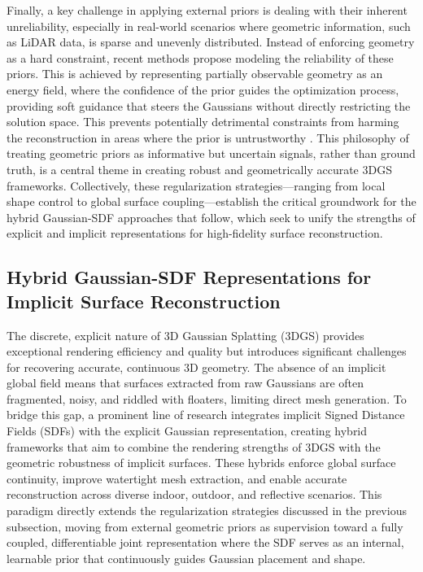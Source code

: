 \documentclass[11pt]{article}
\begin{document}
Finally, a key challenge in applying external priors is dealing with their inherent unreliability, especially in real-world scenarios where geometric information, such as LiDAR data, is sparse and unevenly distributed. Instead of enforcing geometry as a hard constraint, recent methods propose modeling the reliability of these priors. This is achieved by representing partially observable geometry as an energy field, where the confidence of the prior guides the optimization process, providing soft guidance that steers the Gaussians without directly restricting the solution space. This prevents potentially detrimental constraints from harming the reconstruction in areas where the prior is untrustworthy \cite{ref194}. This philosophy of treating geometric priors as informative but uncertain signals, rather than ground truth, is a central theme in creating robust and geometrically accurate 3DGS frameworks. Collectively, these regularization strategies---ranging from local shape control to global surface coupling---establish the critical groundwork for the hybrid Gaussian-SDF approaches that follow, which seek to unify the strengths of explicit and implicit representations for high-fidelity surface reconstruction.

\subsection{Hybrid Gaussian-SDF Representations for Implicit Surface Reconstruction}

The discrete, explicit nature of 3D Gaussian Splatting (3DGS) provides exceptional rendering efficiency and quality but introduces significant challenges for recovering accurate, continuous 3D geometry. The absence of an implicit global field means that surfaces extracted from raw Gaussians are often fragmented, noisy, and riddled with floaters, limiting direct mesh generation. To bridge this gap, a prominent line of research integrates implicit Signed Distance Fields (SDFs) with the explicit Gaussian representation, creating hybrid frameworks that aim to combine the rendering strengths of 3DGS with the geometric robustness of implicit surfaces. These hybrids enforce global surface continuity, improve watertight mesh extraction, and enable accurate reconstruction across diverse indoor, outdoor, and reflective scenarios. This paradigm directly extends the regularization strategies discussed in the previous subsection, moving from external geometric priors as supervision toward a fully coupled, differentiable joint representation where the SDF serves as an internal, learnable prior that continuously guides Gaussian placement and shape.
\end{document}
